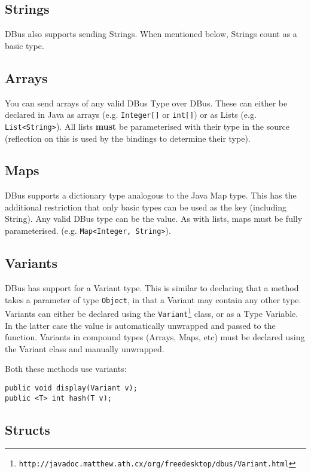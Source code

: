 \documentclass[a4paper,12pt]{article}
\begin{document}
\subsection{Strings}

DBus also supports sending Strings. When mentioned below, Strings
count as a basic type.

\subsection{Arrays}

You can send arrays of any valid DBus Type over DBus. These can
either be declared in Java as arrays (e.g. \verb&Integer[]& or
\verb&int[]&) or as Lists (e.g. \verb&List<String>&). All lists {\bf
must} be parameterised with their type in the source (reflection on
this is used by the bindings to determine their type).

\subsection{Maps}

DBus supports a dictionary type analogous to the Java Map type. This
has the additional restriction that only basic types can be used as
the key (including String). Any valid DBus type can be the value. As
with lists, maps must be fully parameterised. (e.g.
\verb&Map<Integer, String>&).

\subsection{Variants}

DBus has support for a Variant type. This is similar to declaring that a method takes a parameter of type {\tt Object}, in that a Variant may contain any other type. Variants can either be declared using the {\tt Variant\footnote{http://javadoc.matthew.ath.cx/org/freedesktop/dbus/Variant.html}} class, or as a Type Variable. In the latter case the value is automatically unwrapped and passed to the function. Variants in compound types (Arrays, Maps, etc) must be declared using the Variant class and manually unwrapped.

Both these methods use variants:

\begin{verbatim}
public void display(Variant v);
public <T> int hash(T v);
\end{verbatim}

\subsection{Structs}
\end{document}
